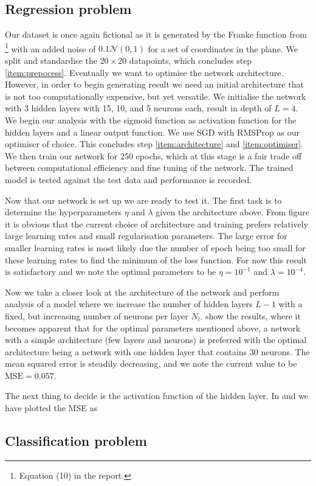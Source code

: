 \subsection{Regression problem}\label{sec:analysis_regression}


    Our dataset is once again fictional as it is generated by the Franke function from \projectOne\footnote{Equation (10) in the report.} with an added noise of $0.1 \mathcal{N}(0, 1)$ for a set of coordinates in the plane. We split and standardise the $20\times 20$ datapoints, which concludes step \ref{item:prepocess}. 
    Eventually we want to optimise the network architecture. However, in order to begin generating result we need an initial architecture that is not too computationally expensive, but yet versatile. We initialise the network with 3 hidden layers with 15, 10, and 5 neurons each, result in depth of $L=4$. We begin our analysis with the sigmoid function as activation function for the hidden layers and a linear output function. We use SGD with RMSProp as our optimiser of choice. This concludes step \ref{item:architecture} and \ref{item:optimiser}.
    We then train our network for 250 epochs, which at this stage is a fair trade off between computational efficiency and fine tuning of the network. The trained model is tested against the test data and performance is recorded. 

    Now that our network is set up we are ready to test it. The first task is to determine the hyperparameters $\eta$ and $\lambda$ given the architecture above. From figure  it is obvious that the current choice of architecture and training prefers relatively large learning rates and small regularisation parameters. The large error for smaller learning rates is most likely due the number of epoch being too small for these learning rates to find the minimum of the loss function. For now this result is satisfactory and we note the optimal parameters to be $\eta=10^{-1}$ and $\lambda=10^{-4}$. 

    Now we take a closer look at the architecture of the network and perform analysis of a model where we increase the number of hidden layers $L-1$ with a fixed, but increasing number of neurons per layer $N_l$.  show the results, where it becomes apparent that for the optimal parameters mentioned above, a network with a simple architecture (few layers and neurons) is preferred with the optimal architecture being a network with one hidden layer that contains 30 neurons. The mean squared error is steadily decreasing, and we note the current value to be $\mathrm{MSE} = 0.057$. 

    The next thing to decide is the activation function of the hidden layer. In  and  we have plotted the MSE as 

  






\subsection{Classification problem}\label{sec:analysis_classification}



